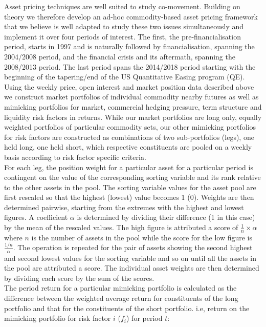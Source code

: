 \documentclass[]{elsarticle} %
\begin{document}
Asset pricing techniques are well suited to study co-movement. Building on theory we therefore develop an ad-hoc commodity-based asset pricing framework that we believe is well adapted to study these two issues simultaneously and implement it over four periods of interest. The first, the pre-financialisation period, starts in 1997 and is naturally followed by financialisation, spanning the 2004/2008 period, and the financial crisis and its aftermath, spanning the 2008/2013 period. The last period spans the 2014/2018 period starting with the beginning of the tapering/end of the US Quantitative Easing program (QE).\\
Using the weekly price, open interest and market position data described above we construct market portfolios of individual commodity nearby futures as well as mimicking portfolios for market, commercial hedging pressure, term structure and liquidity risk factors in returns. While our market portfolios are long only, equally weighted portfolios of particular commodity sets, our other mimicking portfolios for risk factors are constructed as combinations of two sub-portfolios (legs), one held long, one held short, which respective constituents are pooled on a weekly basis according to risk factor specific criteria.\\
For each leg, the position weight for a particular asset for a particular period is contingent on the value of the corresponding sorting variable and its rank relative to the other assets in the pool. The sorting variable values for the asset pool are first rescaled so that the highest (lowest) value becomes 1 (0). Weights are then determined pairwise, starting from the extremes with the highest and lowest figures. A coefficient \(\alpha\) is determined by dividing their difference (1 in this case) by the mean of the rescaled values. The high figure is attributed a score of \(\frac{1}{n} \times \alpha\) where \(n\) is the number of assets in the pool while the score for the low figure is \(\frac{1/n}{\alpha}\). The operation is repeated for the pair of assets showing the second highest and second lowest values for the sorting variable and so on until all the assets in the pool are attributed a score. The individual asset weights are then determined by dividing each score by the sum of the scores.\\
The period return for a particular mimicking portfolio is calculated as the difference between the weighted average return for constituents of the long portfolio and that for the constituents of the short portfolio. i.e, return on the mimicking portfolio for risk factor \(i\) (\(f_{i}\)) for period \(t\):
\end{document}
